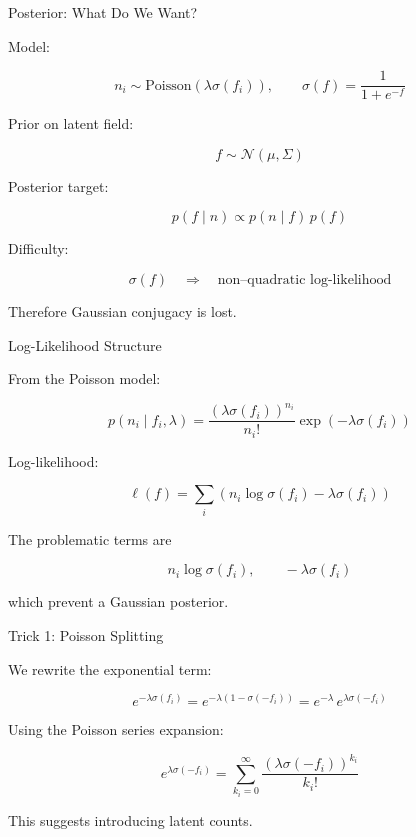 \documentclass[11pt]{beamer}
\begin{document}
\begin{frame}{Posterior: What Do We Want?}

Model:

\[
n_i \sim \text{Poisson}(\lambda \sigma(f_i)),
\qquad
\sigma(f)=\frac{1}{1+e^{-f}}
\]

Prior on latent field:

\[
f \sim \mathcal{N}(\mu,\Sigma)
\]

Posterior target:

\[
p(f \mid n) \propto p(n \mid f)\, p(f)
\]

Difficulty:

\[
\sigma(f) \quad \Rightarrow \quad
\text{non–quadratic log-likelihood}
\]

Therefore Gaussian conjugacy is lost.

\end{frame}

\begin{frame}{Log-Likelihood Structure}

From the Poisson model:

\[
p(n_i \mid f_i,\lambda)
=
\frac{(\lambda \sigma(f_i))^{n_i}}{n_i!}
\exp(-\lambda \sigma(f_i))
\]

Log-likelihood:

\[
\ell(f)
=
\sum_i
\left(
n_i \log\sigma(f_i)
-
\lambda\sigma(f_i)
\right)
\]

The problematic terms are

\[
n_i\log\sigma(f_i), 
\qquad
-\lambda\sigma(f_i)
\]

which prevent a Gaussian posterior.

\end{frame}

\begin{frame}{Trick 1: Poisson Splitting}

We rewrite the exponential term:

\[
e^{-\lambda\sigma(f_i)}
=
e^{-\lambda(1-\sigma(-f_i))}
=
e^{-\lambda}\,e^{\lambda\sigma(-f_i)}
\]

Using the Poisson series expansion:

\[
e^{\lambda\sigma(-f_i)}
=
\sum_{k_i=0}^{\infty}
\frac{(\lambda\sigma(-f_i))^{k_i}}{k_i!}
\]

This suggests introducing latent counts.

\end{frame}
\end{document}
